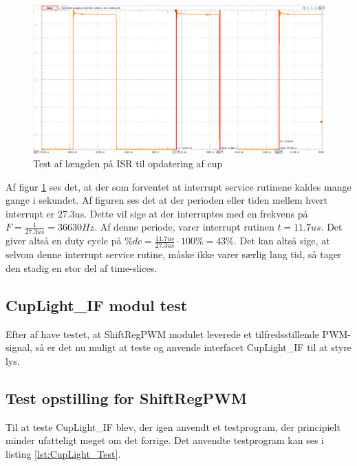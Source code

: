 \documentclass[Modultest/Modultest_main.tex]{subfiles}
\begin{document}
\begin{figure}[H]
    \centering
    \includegraphics[width=\textwidth]{Modultest/CupLight/graphics/Test_isr_length.png}
    \caption{Test af længden på ISR til opdatering af cup}
    \label{fig:cuplight_isr_length}
\end{figure}

Af figur \ref{fig:cuplight_isr_length} ses det, at der som forventet at interrupt service rutinene kaldes mange gange i sekundet. Af figuren ses det at der perioden eller tiden mellem hvert interrupt er 27.3us. Dette vil sige at der interruptes med en frekvens på $F=\frac{1}{27.3us}=36630Hz$. Af denne periode, varer interrupt rutinen $t=11.7us$. Det giver altså en duty cycle på $\%dc=\frac{11.7us}{27.3us}\cdot 100\%=43\%$. Det kan altså sige, at selvom denne interrupt service rutine, måske ikke varer særlig lang tid, så tager den stadig en stor del af time-slices. 

\subsection{CupLight\_IF modul test}
Efter af have testet, at ShiftRegPWM modulet leverede et tilfredsstillende PWM-signal, så er det nu muligt at teste og anvende interfacet CupLight\_IF til at styre lys. 
\subsection{Test opstilling for ShiftRegPWM}
Til at teste CupLight\_IF blev, der igen anvendt et testprogram, der principielt minder ufatteligt meget om det forrige. Det anvendte testprogram kan ses i listing \ref{lst:CupLight_Test}.
\end{document}
